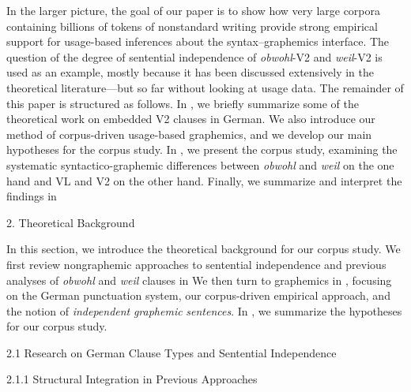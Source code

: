 \begin{styleMoutonTextAfterExample}
In the larger picture, the goal of our paper is to show how very large corpora containing billions of tokens of nonstandard writing provide strong empirical support for usage-based inferences about the syntax–graphemics interface. The question of the degree of sentential independence of \textit{obwohl}{}-V2 and \textit{weil}{}-V2 is used as an example, mostly because it has been discussed extensively in the theoretical literature—but so far without looking at usage data. The remainder of this paper is structured as follows. In , we briefly summarize some of the theo\-retical work on embedded V2 clauses in German. We also introduce our method of corpus-driven usage-based graphemics, and we develop our main hypotheses for the corpus study. In , we present the corpus study, examining the systematic syntactico-graphemic differences between \textit{obwohl} and \textit{weil} on the one hand and VL and V2 on the other hand. Finally, we summarize and interpret the findings in 
\end{styleMoutonTextAfterExample}

\begin{styleMoutonHeadingi}
2.  Theoretical Background
\end{styleMoutonHeadingi}

\begin{styleMoutonText}
In this section, we introduce the theoretical background for our corpus study. We first review nongraphemic approaches to sentential independence and previous analyses of \textit{obwohl} and \textit{weil} clauses in  We then turn to graphemics in , focusing on the German punctuation system, our corpus-driven empirical approach, and the notion of \textit{independent} \textit{graphemic} \textit{sentences}. In , we summarize the hypotheses for our corpus study.
\end{styleMoutonText}

\begin{styleMoutonHeadingi}
2.1    Research on German Clause Types and Sentential Independence
\end{styleMoutonHeadingi}

\begin{styleMoutonHeadingii}
2.1.1  Structural Integration in Previous Approaches
\end{styleMoutonHeadingii}

